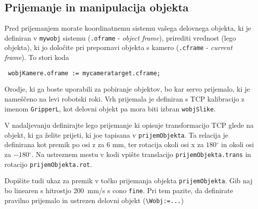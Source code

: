 \subsection{Prijemanje in manipulacija objekta}

Pred prijemanjem morate koordinatnemu sistemu vašega delovnega objekta, ki je definiran v  \verb"mywobj" sistemu (\verb".oframe" - \emph{object frame}), prirediti vrednost (lego objekta), ki jo določite pri prepoznavi objekta s kamero (\verb".cframe" - \emph{current frame}). To stori koda
\begin{verbatim}
 wobjKamere.oframe := mycameratarget.cframe;
\end{verbatim}

Orodje, ki ga boste uporabili za pobiranje objektov, bo kar servo prijemalo, ki je nameščeno na levi robotski roki. Vrh prijemala je definiran s TCP kalibracijo z imenom \verb"GripperL", kot delovni objekt pa mora biti izbran \verb"wobjSlike".

V nadaljevanju definirajte lego prijemanje ki opisuje transformacijo TCP glede na objekt, ki ga želite prijeti, ki joe tapisana v \verb"prijemObjekta". Ta relacija je definirana kot premik po osi z za 6 mm, ter rotacija okoli osi x za $180{}^\circ$ in okoli osi za $-180{}^\circ$. Na ustreznem mestu v kodi vpište translacijo \verb"prijemObjekta.trans" in rotacijo \verb"prijemObjekta.rot".

Dopišite tudi ukaz za premik v točko prijemanja objekta \verb"prijemObjekta". Gib naj bo linearen s hitrostjo 200~mm/s s cono \verb"fine". Pri tem pazite, da definirate pravilno prijemalo in ustrezen delovni objekt (\verb"\Wobj:=...")


%

